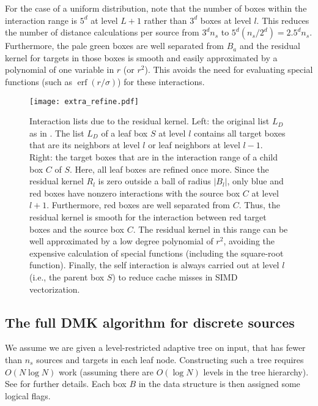 \documentclass[final,letterpaper]{siamart171218}
\DeclareMathOperator\erf{erf}
\newcommand{\acron}{DMK }
\begin{document}
For the case of a uniform distribution, note that
the number of boxes within the interaction range is $5^d$ at level $L+1$ rather
than $3^d$ boxes at level $l$. This reduces the number of distance calculations
per source from $3^d n_s$ to $5^d (n_s/2^d) = 2.5^d n_s$. 
Furthermore, the pale green boxes are well separated from $B_a$ and the residual 
kernel for targets in those boxes is smooth and easily approximated by a polynomial
of one variable in $r$ (or $r^2$). This avoids the need for evaluating special
functions (such as $\erf(r/\sigma)$) for these interactions.

\begin{figure}[!ht]
\centering
\texttt{[image: extra\_refine.pdf]}

\caption{\sf Interaction lists due to the residual kernel. Left: the original list $L_D$
  as in \cite{greengard2023arxiv}. The list $L_D$
  of a leaf box $S$ at level $l$ contains all target boxes that are its neighbors
  at level $l$ or leaf neighbors at level $l-1$. Right: the target boxes that
  are in the interaction
  range of a child box $C$ of $S$. Here, all leaf boxes are refined once more.
  Since the residual kernel $R_l$ is zero outside a ball of radius $|B_l|$,
  only blue and red boxes have nonzero interactions with the source box $C$ at level $l+1$.
  Furthermore, red boxes are well separated from $C$. Thus, the residual
  kernel is smooth for the interaction between red target boxes and the source box $C$.
  The residual kernel in this range can be well approximated by a low degree polynomial
  of $r^2$, avoiding the expensive calculation of special functions (including
  the square-root function). Finally, the self interaction is always carried out at
  level $l$ (i.e., the parent box $S$) to reduce cache misses in SIMD vectorization.}
\label{kernelevaluation}
\end{figure}


\subsection{The full \acron algorithm for discrete sources}

We assume we are given a level-restricted adaptive tree on input,
that has fewer than $n_s$ sources and targets in each leaf node.
Constructing such a tree requires $O(N \log N)$ work (assuming there are 
$O(\log N)$ levels in the tree hierarchy). See
\cite{biros2008sisc} for further details.
Each box $B$ in the data structure is then assigned some
logical flags. 
\end{document}
